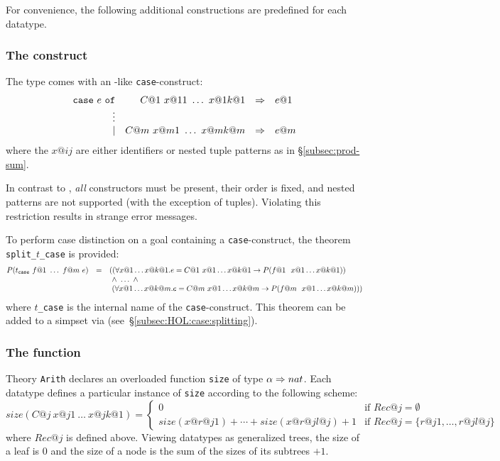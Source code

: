 For convenience, the following additional constructions are predefined for
each datatype.

\subsubsection{The  construct}

The type comes with an \ML-like \texttt{case}-construct:
\[
\begin{array}{rrcl}
\mbox{\tt case}~e~\mbox{\tt of} & C@1~x@{11}~\dots~x@{1k@1} & \Rightarrow & e@1 \\
                           \vdots \\
                           \mid & C@m~x@{m1}~\dots~x@{mk@m} & \Rightarrow & e@m
\end{array}
\]
where the $x@{ij}$ are either identifiers or nested tuple patterns as in
\S\ref{subsec:prod-sum}.
\begin{warn}
In contrast to \ML, {\em all} constructors must be present, their order is
fixed, and nested patterns are not supported (with the exception of tuples).
Violating this restriction results in strange error messages.
\end{warn}

To perform case distinction on a goal containing a \texttt{case}-construct,
the theorem \texttt{split_}$t$\texttt{_case} is provided:
\[
\begin{array}{@{}rcl@{}}
P(t_\mathtt{case}~f@1~\dots~f@m~e) &=&
((\forall x@1 \dots x@{k@1}. e = C@1~x@1\dots x@{k@1} \to
                             P(f@1~~x@1\dots x@{k@1})) \\
&& ~\land~ \dots ~\land \\
&&~ (\forall x@1 \dots x@{k@m}. e = C@m~x@1\dots x@{k@m} \to
                             P(f@m~~x@1\dots x@{k@m})))
\end{array}
\]
where $t$\texttt{_case} is the internal name of the \texttt{case}-construct.
This theorem can be added to a simpset via 
(see~\S\ref{subsec:HOL:case:splitting}).

\subsubsection{The function }\label{sec:HOL:size}

Theory \texttt{Arith} declares an overloaded function \texttt{size} of type
$\alpha\Rightarrow nat$.  Each datatype defines a particular instance of \texttt{size}
according to the following scheme:
\[
size(C@j~x@{j1}~\dots~x@{jk@1}) =
\left\{
\begin{array}{ll}
0 & \mbox{if $Rec@j = \emptyset$} \\
size(x@{r@{j1}}) + \cdots + size(x@{r@{jl@j}}) + 1 &
 \mbox{if $Rec@j = \{r@{j1},\dots,r@{jl@j}\}$}
\end{array}
\right.
\]
where $Rec@j$ is defined above.  Viewing datatypes as generalized trees, the
size of a leaf is 0 and the size of a node is the sum of the sizes of its
subtrees $+1$.

